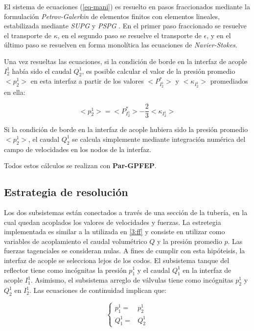 El sistema de ecuaciones (\ref{eq-mani}) es resuelto en pasos fraccionados \cite{lew} mediante la formulación \textit{Petrov-Galerkin} \cite{galerkin} de elementos finitos con elementos lineales, 
estabilizada mediante \textit{SUPG} \cite{supg} y \textit{PSPG} \cite{pspg}.
En el primer paso fraccionado se resuelve el transporte de $\kappa$,
en el segundo paso se resuelve el transporte de $\epsilon$,
y en el último paso se resuelven en forma monolítica las ecuaciones de \textit{Navier-Stokes}.

Una vez resueltas las ecuaciones,
si la condición de borde en la interfaz de acople $I_2^1$ había sido el caudal $Q_2^1$,
es posible calcular el valor de la presión promedio $<p_2^1>$ en esta interfaz
a partir de los valores $<P^*_{I_2^1}>$ y $<\kappa_{I_2^1}>$ promediados en ella:

\begin{equation}
<p_2^1> = <P^*_{I_2^1}> - \frac {2}{3} <\kappa_{I_2^1}>
\end{equation}

Si la condición de borde en la interfaz de acople hubiera sido la presión promedio $<p_2^1>$,
el caudal $Q_2^1$ se calcula simplemente mediante integración numérica del campo de velocidades en los nodos de la interfaz.

Todos estos cálculos se realizan con \textbf{Par-GPFEP}.

\subsection*{Estrategia de resolución}

Los dos subsistemas están conectados a través de una sección de la tubería,
en la cual quedan acoplados los valores de velocidades y fuerzas.
La estretegia implementada es similar a la utilizada en \ref{3:ff} y consiste en utilizar como variables de acoplamiento el caudal volumétrico $Q$ y la presión promedio $p$.
Las fuerzas tagenciales se consideran nulas.
A fines de cumplir con esta hipóteisis, la interfaz de acople se selecciona lejos de los codos.
El subsistema tanque del reflector tiene como incógnitas la presión $p_1^1$ y el caudal $Q_1^1$ en la interfaz de acople $I_1^1$.
Asimismo, el subsistema arreglo de válvulas tiene como incógnitas $p_2^1$ y $Q_2^1$ en $I_2^1$.
Las ecuaciones de continuidad implican que:

\begin{equation}
\left\{ \begin{array}{rl}
p_1^1 =& p_2^1 \\
Q_1^1 =& Q_2^1
\end{array}
\right.
\end{equation}

